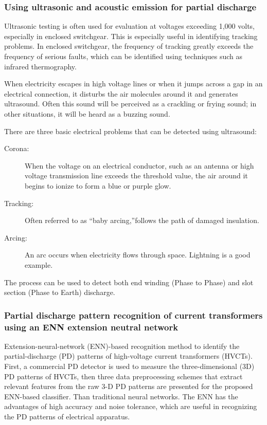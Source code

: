 \subsubsection{Using ultrasonic and acoustic emission for partial discharge}
Ultrasonic testing is often used for evaluation at voltages exceeding 1,000 volts, especially in enclosed switchgear. This is especially useful in identifying tracking problems. In enclosed switchgear, the frequency of tracking greatly exceeds the frequency of serious faults, which can be identified using techniques such as infrared thermography\setlength{\parskip}{1em}.

When electricity escapes in high voltage lines or when it jumps across a gap in an electrical connection, it disturbs the air molecules around it and generates ultrasound. Often this sound will be perceived as a crackling or frying sound; in other situations, it will be heard as a buzzing sound.

There are three basic electrical problems that can be detected using ultrasound\setlength{\parskip}{0em}: 
\begin{description}
\item[Corona:] When the voltage on an electrical conductor, such as an antenna or high voltage transmission line exceeds the threshold value, the air around it begins to ionize to form a blue or purple glow.

\item[Tracking:] Often referred to as \textquotedblleft baby arcing,\textquotedblright follows the path of damaged insulation.

\item[Arcing:] An arc occurs when electricity flows through space. Lightning is a good example. 
\end{description}

The process can be used to detect both end winding (Phase to Phase) and slot section (Phase to Earth) discharge.

\subsubsection{Partial discharge pattern recognition of current transformers using an ENN  extension neutral network}
Extension-neural-network (ENN)-based recognition method to identify the partial-discharge (PD) patterns of high-voltage current transformers (HVCTs). First, a commercial PD detector is used to measure the three-dimensional (3D) PD patterns of HVCTs, then three data preprocessing schemes that extract relevant features from the raw 3-D PD patterns are presented for the proposed ENN-based classifier. Than traditional neural networks. The ENN has the advantages of high accuracy and noise tolerance, which are useful in recognizing the PD patterns of electrical apparatus. 

